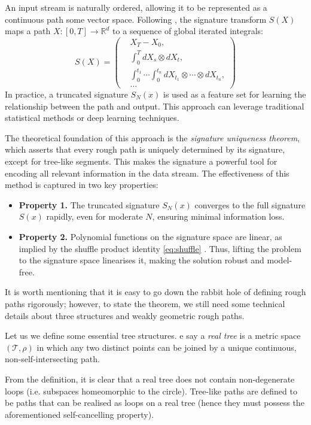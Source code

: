 An input stream is naturally ordered, allowing it to be represented as a continuous path some vector space. Following \cite{geng2021introduction}, the signature transform \( S(X) \) maps a path \( X: [0, T] \to \mathbb{R} ^{d} \) to a sequence of global iterated integrals:
\[
  S(X) = \left(  \begin{split}
 & X_{T} - X_{0},    \\
   &   \int_0^T \! dX_s \otimes dX_t, \\
 & \int_0^{t_1} \cdots \int_0^{t_n} dX_{t_1} \otimes \cdots \otimes dX_{t_n}, \\
  & \dots
    \end{split}\right)
\]
In practice, a truncated signature \( S_N(x) \) is used as a feature set for learning the relationship between the path and output. This approach can leverage traditional statistical methods or deep learning techniques.

The theoretical foundation of this approach is the \textit{signature uniqueness theorem}, which asserts that every rough path is uniquely determined by its signature, except for tree-like segments. This makes the signature a powerful tool for encoding all relevant information in the data stream. The effectiveness of this method is captured in two key properties:

\begin{itemize}
    \item \textbf{Property 1.} The truncated signature \( S_N(x) \) converges to the full signature \( S(x) \) rapidly, even for moderate \( N \), ensuring minimal information loss.

    \item \textbf{Property 2.} Polynomial functions on the signature space are linear, as implied by the shuffle product identity \eqref{eq:shuffle} . Thus, lifting the problem to the signature space linearises it, making the solution robust and model-free.
\end{itemize}


It is worth mentioning that it is easy to go down the rabbit hole of defining rough paths rigorously; however, to state the theorem, we still need some technical details about three structures and weakly geometric rough paths.

Let us we define some essential tree structures.
e say a \textit{real tree} is a metric space $(\mathcal{T}, \rho)$ in which any two distinct points can be joined by a unique continuous, non-self-intersecting path.

From the definition, it is clear that a real tree does not contain non-degenerate loops (i.e. subspaces homeomorphic to the circle). Tree-like paths are defined to be paths that can be realised as loops on a real tree (hence they must possess the aforementioned self-cancelling property).


